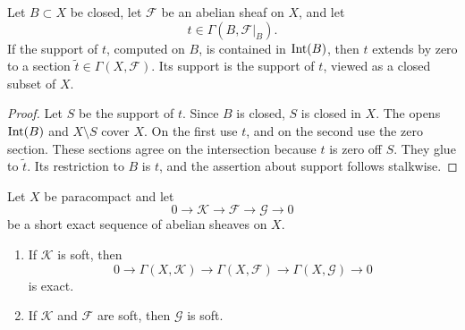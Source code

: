 \begin{lemma}
\label{lemma-extend-zero-from-closed}
Let $B \subset X$ be closed, let $\mathcal{F}$ be an abelian sheaf on
$X$, and let
$$
t \in \Gamma(B, \mathcal{F}|_B).
$$
If the support of $t$, computed on $B$, is contained in
$\mathop{\rm Int}(B)$, then $t$ extends by zero to a section
$\widetilde t \in \Gamma(X, \mathcal{F})$. Its support is the support
of $t$, viewed as a closed subset of $X$.
\end{lemma}

\begin{proof}
Let $S$ be the support of $t$. Since $B$ is closed, $S$ is closed in
$X$. The opens $\mathop{\rm Int}(B)$ and $X \setminus S$ cover $X$.
On the first use $t$, and on the second use the zero section. These
sections agree on the intersection because $t$ is zero off $S$.
They glue to $\widetilde t$. Its restriction to $B$ is $t$, and the
assertion about support follows stalkwise.
\end{proof}

\begin{lemma}
\label{lemma-soft-exact-paracompact}
Let $X$ be paracompact and let
$$
0 \longrightarrow \mathcal{K} \longrightarrow \mathcal{F}
\longrightarrow \mathcal{G} \longrightarrow 0
$$
be a short exact sequence of abelian sheaves on $X$.
\begin{enumerate}
\item If $\mathcal{K}$ is soft, then
$$
0 \longrightarrow \Gamma(X, \mathcal{K})
\longrightarrow \Gamma(X, \mathcal{F})
\longrightarrow \Gamma(X, \mathcal{G})
\longrightarrow 0
$$
is exact.
\item If $\mathcal{K}$ and $\mathcal{F}$ are soft, then
$\mathcal{G}$ is soft.
\end{enumerate}
\end{lemma}

